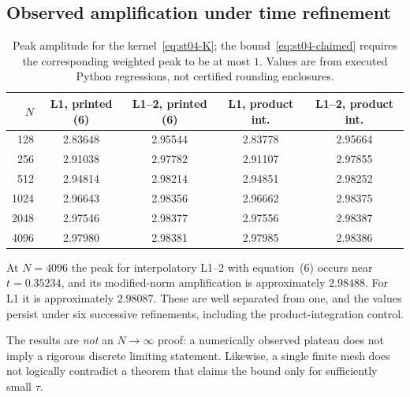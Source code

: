 \documentclass[11pt,a4paper]{amsart}
\theoremstyle{remark}
\theoremstyle{plain}
\theoremstyle{remark}
\numberwithin{equation}{section}
\begin{document}
\subsection{Observed amplification under time refinement}
\begin{table}[ht]
\centering
\caption{Peak amplitude for the kernel~\eqref{eq:st04-K}; the bound~\eqref{eq:st04-claimed} requires the corresponding weighted peak to be at most $1$. Values are from executed Python regressions, not certified rounding enclosures.}
\label{tab:st04-peaks}
\small
\begin{tabular}{@{}rcccc@{}}
\hline
$N$ & L1, printed (6) & L1--2, printed (6) & L1, product int. & L1--2, product int.\\
\hline
128 & 2.83648 & 2.95544 & 2.83778 & 2.95664\\
256 & 2.91038 & 2.97782 & 2.91107 & 2.97855\\
512 & 2.94814 & 2.98214 & 2.94851 & 2.98252\\
1024 & 2.96643 & 2.98356 & 2.96662 & 2.98375\\
2048 & 2.97546 & 2.98377 & 2.97556 & 2.98387\\
4096 & 2.97980 & 2.98381 & 2.97985 & 2.98386\\
\hline
\end{tabular}
\end{table}
At $N=4096$ the peak for interpolatory L1--2 with equation~(6) occurs near $t=0.35234$, and its modified-norm amplification is approximately $2.98488$. For L1 it is approximately $2.98087$. These are well separated from one, and the values persist under six successive refinements, including the product-integration control.

The results are \emph{not} an $N\to\infty$ proof: a numerically observed plateau does not imply a rigorous discrete limiting statement. Likewise, a single finite mesh does not logically contradict a theorem that claims the bound only for sufficiently small $\tau$.
\end{document}
